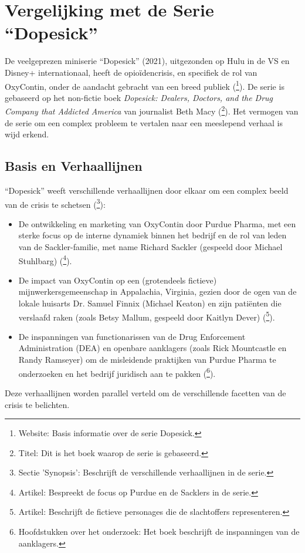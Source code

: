 \documentclass[11pt, a4paper]{report} %
\begin{document}
\section{Vergelijking met de Serie \enquote{Dopesick}}
De veelgeprezen miniserie \enquote{Dopesick} (2021), uitgezonden op Hulu in de VS en Disney+ internationaal, heeft de opioïdencrisis, en specifiek de rol van OxyContin, onder de aandacht gebracht van een breed publiek (\cite{IMDbDopesick}\footnote{Website: Basis informatie over de serie Dopesick.}). De serie is gebaseerd op het non-fictie boek \textit{Dopesick: Dealers, Doctors, and the Drug Company that Addicted America} van journalist Beth Macy (\cite{Macy2018Dopesick}\footnote{Titel: Dit is het boek waarop de serie is gebaseerd.}). Het vermogen van de serie om een complex probleem te vertalen naar een meeslepend verhaal is wijd erkend.

\subsection{Basis en Verhaallijnen}
\enquote{Dopesick} weeft verschillende verhaallijnen door elkaar om een complex beeld van de crisis te schetsen (\cite{WikipediaDopesickMiniseries}\footnote{Sectie 'Synopsis': Beschrijft de verschillende verhaallijnen in de serie.}):
\begin{itemize}
    \item De ontwikkeling en marketing van OxyContin door Purdue Pharma, met een sterke focus op de interne dynamiek binnen het bedrijf en de rol van leden van de Sackler-familie, met name Richard Sackler (gespeeld door Michael Stuhlbarg) (\cite{AvenuesRecoveryDopesickTrue}\footnote{Artikel: Bespreekt de focus op Purdue en de Sacklers in de serie.}).
    \item De impact van OxyContin op een (grotendeels fictieve) mijnwerkersgemeenschap in Appalachia, Virginia, gezien door de ogen van de lokale huisarts Dr. Samuel Finnix (Michael Keaton) en zijn patiënten die verslaafd raken (zoals Betsy Mallum, gespeeld door Kaitlyn Dever) (\cite{HealthlineDopesickTruth}\footnote{Artikel: Beschrijft de fictieve personages die de slachtoffers representeren.}).
    \item De inspanningen van functionarissen van de Drug Enforcement Administration (DEA) en openbare aanklagers (zoals Rick Mountcastle en Randy Ramseyer) om de misleidende praktijken van Purdue Pharma te onderzoeken en het bedrijf juridisch aan te pakken (\cite{Macy2018Dopesick}\footnote{Hoofdstukken over het onderzoek: Het boek beschrijft de inspanningen van de aanklagers.}).
\end{itemize}
Deze verhaallijnen worden parallel verteld om de verschillende facetten van de crisis te belichten.
\end{document}
